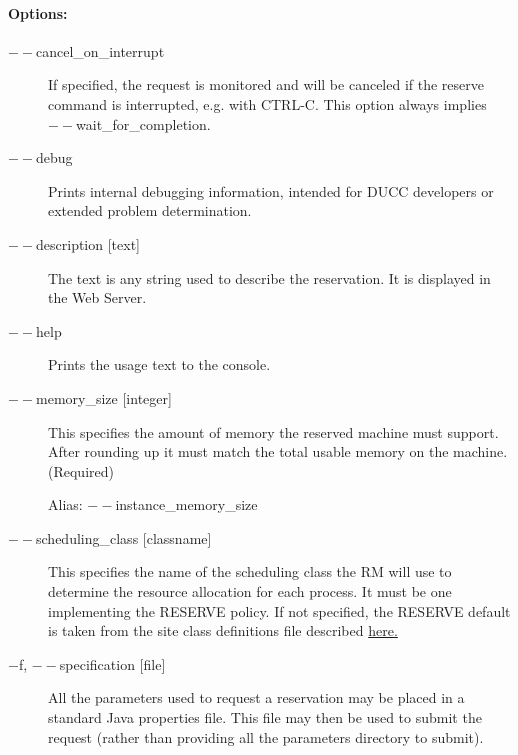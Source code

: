     \paragraph{Options:}
    
        \begin{description}

            \item[$--$cancel\_on\_interrupt] If specified, the request is monitored 
              and will be canceled if the reserve command is interrupted, e.g. with CTRL-C. 
              This option always implies $--$wait\_for\_completion.

            \item[$--$debug ]          
              Prints internal debugging information, intended for DUCC developers or extended problem determination.
              
            \item[$--$description {[text]}]               
              The text is any string used to describe the reservation. It is displayed in the Web Server. 
              
            \item[$--$help ]             
              Prints the usage text to the console. 
                            
            \item[$--$memory\_size {[integer]}]               
              This specifies the amount of memory the reserved machine must support. After rounding
              up it must match the total usable memory on the machine. (Required)

              Alias: $--$instance\_memory\_size

            \item[$--$scheduling\_class {[classname]}]               
              This specifies the name of the scheduling class the RM will use to determine the resource 
              allocation for each process. It must be one implementing the RESERVE policy.
              If not specified, the RESERVE default is taken from the site class definitions file
              described \hyperref[subsubsec:class.configuration]{here.} 
              
            \item[$-$f, $--$specification {[file]}]               
              All the parameters used to request a reservation may be placed in a standard Java 
              properties file. This file may then be used to submit the request (rather than providing all 
              the parameters directory to submit). 


\end{description}
